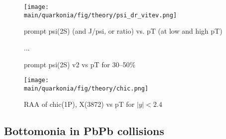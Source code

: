 \documentclass[../report.tex]{subfiles}
\providecommand{\main}{..}
\begin{document}
\begin{figure}
\begin{center}
 \texttt{[image: \\main/quarkonia/fig/theory/psi\_dr\_vitev.png]}
\end{center}

 \caption{prompt psi(2S) (and J/psi, or ratio) vs. pT (at low and high pT) }
\end{figure}

\begin{figure}
...

 \caption{prompt psi(2S) v2 vs pT for 30--50\%}
\end{figure}

\begin{figure}
\begin{center}
 \texttt{[image: \\main/quarkonia/fig/theory/chic.png]}
\end{center}

 \caption{RAA of chic(1P), X(3872) vs pT for $|y|<2.4$}
\end{figure}

\clearpage

\subsection{Bottomonia in PbPb collisions}%

\end{document}
